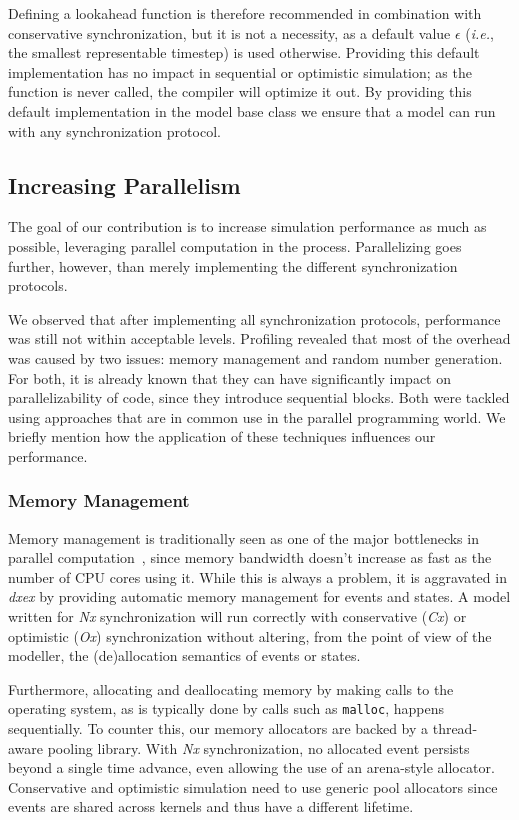 Defining a lookahead function is therefore recommended in combination with conservative synchronization, but it is not a necessity, as a default value $\epsilon$ (\textit{i.e.}, the smallest representable timestep) is used otherwise.
Providing this default implementation has no impact in sequential or optimistic simulation; as the function is never called, the compiler will optimize it out.
By providing this default implementation in the model base class we ensure that a model can run with any synchronization protocol.

\subsection{Increasing Parallelism}
The goal of our contribution is to increase simulation performance as much as possible, leveraging parallel computation in the process.
Parallelizing goes further, however, than merely implementing the different synchronization protocols.

We observed that after implementing all synchronization protocols, performance was still not within acceptable levels.
Profiling revealed that most of the overhead was caused by two issues: memory management and random number generation.
For both, it is already known that they can have significantly impact on parallelizability of code, since they introduce sequential blocks.
Both were tackled using approaches that are in common use in the parallel programming world.
We briefly mention how the application of these techniques influences our performance.

\subsubsection{Memory Management}
\label{sec:4-subsec:overhead-pgraph:memory}
Memory management is traditionally seen as one of the major bottlenecks in parallel computation~\cite{Memory}, since memory bandwidth doesn't increase as fast as the number of CPU cores using it.
While this is always a problem, it is aggravated in \textit{dxex} by providing automatic memory management for events and states.
A model written for \textit{Nx} synchronization will run correctly with conservative (\textit{Cx}) or optimistic (\textit{Ox}) synchronization without altering, from the point of view of the modeller, the (de)allocation semantics of events or states.

Furthermore, allocating and deallocating memory by making calls to the operating system, as is typically done by calls such as \texttt{malloc}, happens sequentially.
To counter this, our memory allocators are backed by a thread-aware pooling library.
With \textit{Nx} synchronization, no allocated event persists beyond a single time advance, even allowing the use of an arena-style allocator.
Conservative and optimistic simulation need to use generic pool allocators since events are shared across kernels and thus have a different lifetime.

